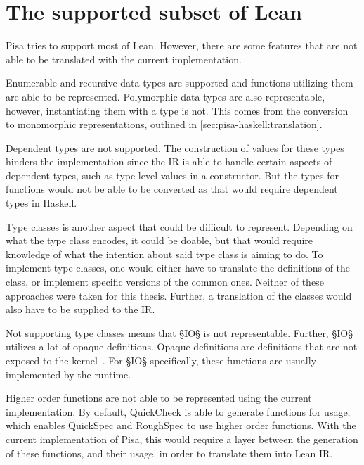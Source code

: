 \section{The supported subset of Lean}\label{sec:supported-subset-of-lean}
Pisa tries to support most of Lean.
However, there are some features that are not able to be translated with the current implementation.

Enumerable and recursive data types are supported and functions utilizing them are able to be represented.
Polymorphic data types are also representable, however, instantiating them with a type is not.
This comes from the conversion to monomorphic representations, outlined in \cref{sec:pisa-haskell:translation}.

Dependent types are not supported.
The construction of values for these types hinders the implementation since the IR is able to handle certain aspects of dependent types, such as type level values in a constructor.
But the types for functions would not be able to be converted as that would require dependent types in Haskell.

Type classes is another aspect that could be difficult to represent.
Depending on what the type class encodes, it could be doable, but that would require knowledge of what the intention about said type class is aiming to do.
To implement type classes, one would either have to translate the definitions of the class, or implement specific versions of the common ones.
Neither of these approaches were taken for this thesis.
Further, a translation of the classes would also have to be supplied to the IR.

Not supporting type classes means that §IO§ is not representable.
Further, §IO§ utilizes a lot of opaque definitions.
Opaque definitions are definitions that are not exposed to the kernel~\autocite{Definitions}.
For §IO§ specifically, these functions are usually implemented by the runtime.

Higher order functions are not able to be represented using the current implementation.
By default, QuickCheck is able to generate functions for usage, which enables QuickSpec and RoughSpec to use higher order functions.
With the current implementation of Pisa, this would require a layer between the generation of these functions, and their usage, in order to translate them into Lean IR.
